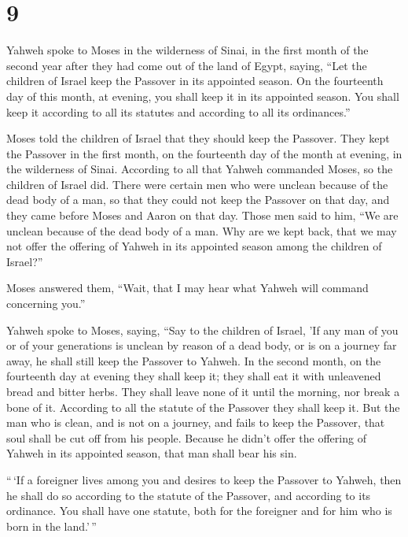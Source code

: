 \hypertarget{section-8}{%
\section{9}\label{section-8}}

 Yahweh spoke to Moses in the wilderness of Sinai, in the
first month of the second year after they had come out of the land of
Egypt, saying,  ``Let the children of Israel keep the
Passover in its appointed season.  On the fourteenth day
of this month, at evening, you shall keep it in its appointed season.
You shall keep it according to all its statutes and according to all its
ordinances.''

 Moses told the children of Israel that they should keep
the Passover.  They kept the Passover in the first month,
on the fourteenth day of the month at evening, in the wilderness of
Sinai. According to all that Yahweh commanded Moses, so the children of
Israel did.  There were certain men who were unclean
because of the dead body of a man, so that they could not keep the
Passover on that day, and they came before Moses and Aaron on that day.
 Those men said to him, ``We are unclean because of the
dead body of a man. Why are we kept back, that we may not offer the
offering of Yahweh in its appointed season among the children of
Israel?''

 Moses answered them, ``Wait, that I may hear what Yahweh
will command concerning you.''

 Yahweh spoke to Moses, saying,  ``Say to
the children of Israel, 'If any man of you or of your generations is
unclean by reason of a dead body, or is on a journey far away, he shall
still keep the Passover to Yahweh.  In the second month,
on the fourteenth day at evening they shall keep it; they shall eat it
with unleavened bread and bitter herbs.  They shall leave
none of it until the morning, nor break a bone of it. According to all
the statute of the Passover they shall keep it.  But the
man who is clean, and is not on a journey, and fails to keep the
Passover, that soul shall be cut off from his people. Because he didn't
offer the offering of Yahweh in its appointed season, that man shall
bear his sin.

 ``\,`If a foreigner lives among you and desires to keep
the Passover to Yahweh, then he shall do so according to the statute of
the Passover, and according to its ordinance. You shall have one
statute, both for the foreigner and for him who is born in the
land.'\,''


